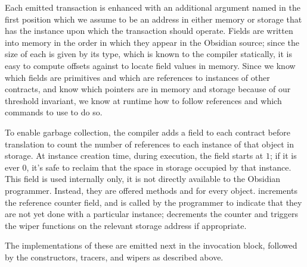 Each emitted transaction is enhanced with an additional argument
named  in the first position which we assume to be an address
in either memory or storage that has the instance upon which the
transaction should operate. Fields are written into memory in the order in
which they appear in the Obsidian source; since the size of each is given
by its type, which is known to the compiler statically, it is easy to
compute offsets against  to locate field values in
memory. Since we know which fields are primitives and which are references
to instances of other contracts, and know which pointers are in memory and
storage because of our threshold invariant, we know at runtime how to
follow references and which commands to use to do so.

To enable garbage collection, the compiler adds a field to each contract
before translation to count the number of references to each instance of
that object in storage. At instance creation time, during execution, the
field starts at $1$; if it is ever $0$, it's safe to reclaim that the space
in storage occupied by that instance. This field is used internally only,
it is not directly available to the Obsidian programmer. Instead, they are
offered methods  and  for every
object.  increments the reference counter field, and is
called by the programmer to indicate that they are not yet done with a
particular instance;  decrements the counter and triggers
the wiper functions on the relevant storage address if appropriate.

The implementations of these are emitted next in the invocation block,
followed by the constructors, tracers, and wipers as described above.
